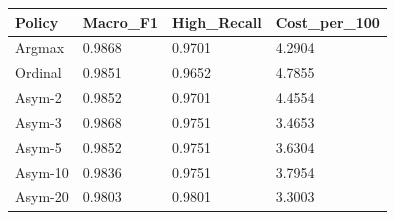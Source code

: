 \begin{tabular}{llll}
\toprule
Policy & Macro\_F1 & High\_Recall & Cost\_per\_100 \\
\midrule
Argmax & 0.9868 & 0.9701 & 4.2904 \\
Ordinal & 0.9851 & 0.9652 & 4.7855 \\
Asym-2 & 0.9852 & 0.9701 & 4.4554 \\
Asym-3 & 0.9868 & 0.9751 & 3.4653 \\
Asym-5 & 0.9852 & 0.9751 & 3.6304 \\
Asym-10 & 0.9836 & 0.9751 & 3.7954 \\
Asym-20 & 0.9803 & 0.9801 & 3.3003 \\
\bottomrule
\end{tabular}